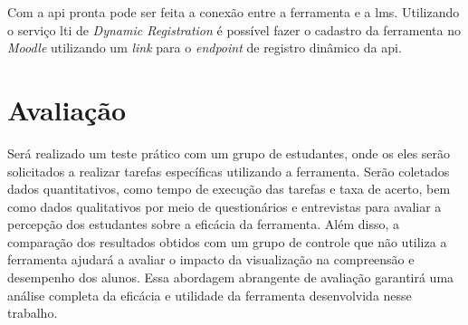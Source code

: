 \setlength{\abovecaptionskip}{10pt plus 0pt minus 0pt}
\setlength{\belowcaptionskip}{5pt plus 0pt minus 0pt}
\begin{table}[h]
\centering\setlength{\extrarowheight}{2pt}
\label{qua:endpoints}
{}
\end{table}

Com a \gls{api} pronta pode ser feita a conexão entre a ferramenta e a \gls{lms}. Utilizando o serviço \gls{lti} de \textit{Dynamic Registration} é possível fazer o cadastro da ferramenta no \textit{Moodle} utilizando um \textit{link} para o \textit{endpoint} de registro dinâmico da \gls{api}.

\section{Avaliação}
Será realizado um teste prático com um grupo de estudantes, onde os eles serão solicitados a realizar tarefas específicas utilizando a ferramenta. Serão coletados dados quantitativos, como tempo de execução das tarefas e taxa de acerto, bem como dados qualitativos por meio de questionários e entrevistas para avaliar a percepção dos estudantes sobre a eficácia da ferramenta. Além disso, a comparação dos resultados obtidos com um grupo de controle que não utiliza a ferramenta ajudará a avaliar o impacto da visualização na compreensão e desempenho dos alunos. Essa abordagem abrangente de avaliação garantirá uma análise completa da eficácia e utilidade da ferramenta desenvolvida nesse trabalho.

